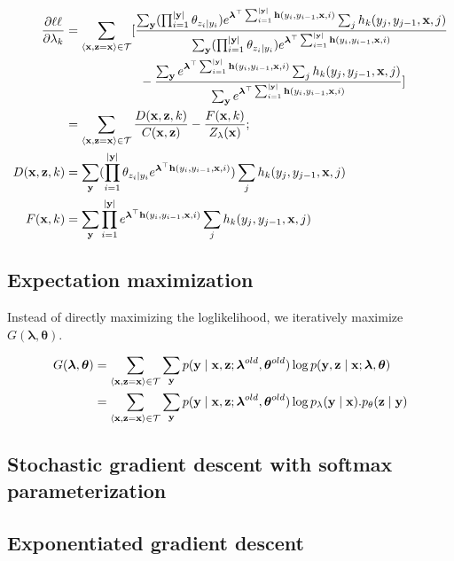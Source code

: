 \documentclass[11pt,onecolumn]{article}
\begin{document}
\begin{align}
  \frac{\partial \ell\ell}{\partial \lambda_k} &= \sum_{\langle\mathbf{x},\mathbf{z}=\mathbf{x}\rangle \in \cal{T}} 
  [
     \frac{\sum_{\mathbf{y}} (\prod_{i=1}^{|\mathbf{y}|} \theta_{z_i\mid y_i}) e^{\boldsymbol{\lambda}^\top \sum_{i=1}^{|\mathbf{y}|} \mathbf{h}(y_i, y_{i-1}, \mathbf{x}, i)} \sum_{j} h_k(y_j, y_{j-1}, \mathbf{x}, j) } 
          {\sum_{\mathbf{y}} (\prod_{i=1}^{|\mathbf{y}|} \theta_{z_i\mid y_i}) e^{\boldsymbol{\lambda}^\top \sum_{i=1}^{|\mathbf{y}|} \mathbf{h}(y_i, y_{i-1}, \mathbf{x}, i)} } \nonumber \\
     &\qquad \qquad \qquad - \frac{\sum_{\mathbf{y}} e^{\boldsymbol{\lambda}^\top \sum_{i=1}^{|\mathbf{y}|} \mathbf{h}(y_i, y_{i-1}, \mathbf{x}, i)} \sum_{j} h_k(y_j, y_{j-1}, \mathbf{x}, j)}
          {\sum_{\mathbf{y}} e^{\boldsymbol{\lambda}^\top \sum_{i=1}^{|\mathbf{y}|} \mathbf{h}(y_i, y_{i-1}, \mathbf{x}, i)} }
  ] \\
  &= \sum_{\langle\mathbf{x},\mathbf{z}=\mathbf{x}\rangle \in \cal{T}}
    \frac{D(\mathbf{x}, \mathbf{z}, k)}{C(\mathbf{x}, \mathbf{z})} - \frac{F(\mathbf{x}, k)}{Z_\lambda(\mathbf{x})}; \\
  D(\mathbf{x}, \mathbf{z}, k) &= \sum_{\mathbf{y}} (\prod_{i=1}^{|\mathbf{y}|} \theta_{z_i\mid y_i} e^{\boldsymbol{\lambda}^\top \mathbf{h}(y_i, y_{i-1}, \mathbf{x}, i)}) \sum_{j} h_k(y_j, y_{j-1}, \mathbf{x}, j) \\
  F(\mathbf{x}, k) &= \sum_{\mathbf{y}} \prod_{i=1}^{|\mathbf{y}|} e^{\boldsymbol{\lambda}^\top \mathbf{h}(y_i, y_{i-1}, \mathbf{x}, i)} \sum_{j} h_k(y_j, y_{j-1}, \mathbf{x}, j)
\end{align} 



\subsection{Expectation maximization}
Instead of directly maximizing the loglikelihood, we iteratively maximize $G(\boldsymbol{\lambda}, \boldsymbol{\theta})$. 

\begin{align}
G(\boldsymbol{\lambda}, \boldsymbol{\theta}) &=
  \sum_{\langle\mathbf{x},\mathbf{z}=\mathbf{x}\rangle \in \cal{T}} 
    \sum_\mathbf{y} 
      p(\mathbf{y}\mid\mathbf{x}, \mathbf{z}; \boldsymbol{\lambda}^{old}, \boldsymbol{\theta}^{old}) 
      \log
        p(\mathbf{y}, \mathbf{z} \mid \mathbf{x}; \boldsymbol{\lambda}, \boldsymbol{\theta}) \\
&=
  \sum_{\langle\mathbf{x},\mathbf{z}=\mathbf{x}\rangle \in \cal{T}} 
    \sum_\mathbf{y} 
      p(\mathbf{y}\mid\mathbf{x}, \mathbf{z}; \boldsymbol{\lambda}^{old}, \boldsymbol{\theta}^{old}) 
      \log
        p_\lambda(\mathbf{y} \mid \mathbf{x}) 
        . p_\theta(\mathbf{z} \mid \mathbf{y}) \\
\end{align}


\subsection{Stochastic gradient descent with softmax parameterization}


\subsection{Exponentiated gradient descent}
\end{document}
